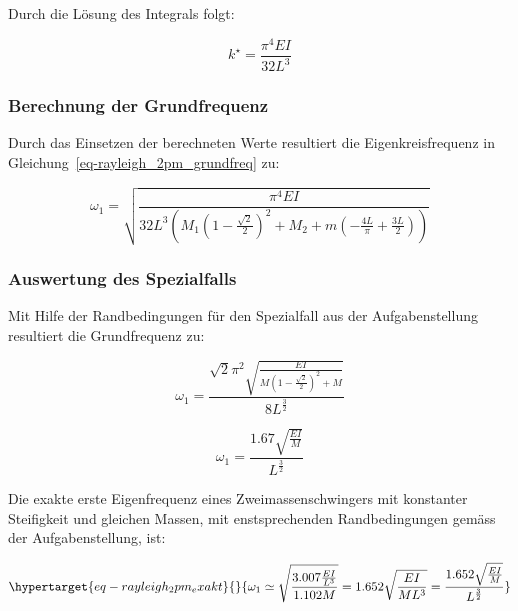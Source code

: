 \documentclass[
  letterpaper,
  DIV=11]{scrreprt}
\begin{document}
Durch die Lösung des Integrals folgt:

\begin{equation}k^{\star} = \frac{\pi^{4} E I}{32 L^{3}}\end{equation}

\hypertarget{berechnung-der-grundfrequenz}{%
\subsubsection{Berechnung der
Grundfrequenz}\label{berechnung-der-grundfrequenz}}

Durch das Einsetzen der berechneten Werte resultiert die
Eigenkreisfrequenz in Gleichung~\ref{eq-rayleigh_2pm_grundfreq} zu:

\begin{equation}\omega_{1} = \sqrt{\frac{\pi^{4} E I}{32 L^{3} \left(M_{1} \left(1 - \frac{\sqrt{2}}{2}\right)^{2} + M_{2} + m \left(- \frac{4 L}{\pi} + \frac{3 L}{2}\right)\right)}}\end{equation}

\hypertarget{auswertung-des-spezialfalls}{%
\subsubsection{Auswertung des
Spezialfalls}\label{auswertung-des-spezialfalls}}

Mit Hilfe der Randbedingungen für den Spezialfall aus der
Aufgabenstellung resultiert die Grundfrequenz zu:

\begin{equation}\omega_{1} = \frac{\sqrt{2} \pi^{2} \sqrt{\frac{E I}{M \left(1 - \frac{\sqrt{2}}{2}\right)^{2} + M}}}{8 L^{\frac{3}{2}}}\end{equation}

\begin{equation}\omega_{1} = \frac{1.67 \sqrt{\frac{E I}{M}}}{L^{\frac{3}{2}}}\end{equation}

Die exakte erste Eigenfrequenz eines Zweimassenschwingers mit konstanter
Steifigkeit und gleichen Massen, mit enstsprechenden Randbedingungen
gemäss der Aufgabenstellung, ist:

\begin{equation}\protect\hypertarget{eq-rayleigh_2pm_exakt}{}{
\omega_1 \simeq \sqrt{\frac{3.007\frac{EI}{L^3}}{1.102 M}} = 1.652 \sqrt{\frac{EI}{ML^3}} = \frac{1.652 \sqrt{\frac{E I}{M}}}{L^{\frac{3}{2}}}
}\label{eq-rayleigh_2pm_exakt}\end{equation}
\end{document}
